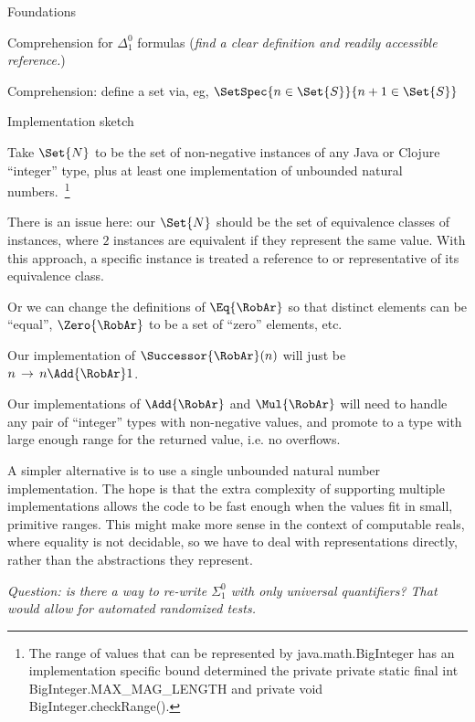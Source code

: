 \documentclass[12pt]{PalisadesLakesBook}
\begin{document}
\begin{plSection}{Foundations}
\begin{plSection}{\texorpdfstring{}{RCA0}}
\begin{plSection}{Comprehension for \texorpdfstring{$\Delta^{0}_{1}$}{Delta01} formulas}
    (\TODO \textit{find a clear definition and readily accessible reference.})

    Comprehension: define a set via, eg, $\SetSpec{n \in \Set{S}}{n+1 \in \Set{S}}$

  \end{plSection}%

  \begin{plSection}{Implementation sketch}

    Take $\Set{N}$ to be the set of non-negative instances of any Java or Clojure ``integer'' type,
    plus at least one implementation of unbounded natural numbers.~\footnote{
    The range of values that can be represented by {\javaFont java.math.BigInteger}
    has an implementation specific bound determined the private
    {\javaFont private static final int BigInteger.MAX\_MAG\_LENGTH}
    and {\javaFont private void BigInteger.checkRange()}.}

    There is an issue here: our $\Set{N}$ should be the set of equivalence classes of instances,
    where $2$ instances are equivalent if they represent the same value.
    With this approach, a specific instance is treated a reference to or representative of its equivalence class.

    Or we can change the definitions of $\Eq{\RobAr}$ so that distinct elements can be ``equal'',
    $\Zero{\RobAr}$ to be a set of ``zero'' elements, etc.

    Our implementation of $\Successor{\RobAr}(n)$ will just be $n \,\rightarrow\, n \Add{\RobAr} 1$.

    Our implementations of $\Add{\RobAr}$ and $\Mul{\RobAr}$ will need to handle any pair of
    ``integer'' types with non-negative values, and promote to a type with large enough range
    for the returned value, i.e. no overflows.

    A simpler alternative is to use a single unbounded natural number implementation.
    The hope is that the extra complexity of supporting multiple implementations allows the code
    to be fast enough when the values fit in small, primitive ranges.
    This might make more sense in the context of computable reals,
    where equality is not decidable, so we have to deal with representations directly,
    rather than the abstractions they represent.

  \textit{Question: is there a way to re-write $\Sigma^0_1$ with only universal quantifiers?
  That would allow for automated randomized tests.}


\end{plSection}
\end{plSection}
\end{plSection}
\end{document}
